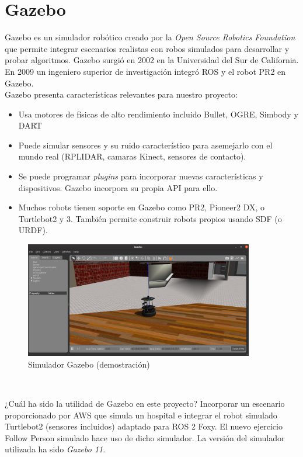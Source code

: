 \section{Gazebo}
\label{sec:gazebo}

Gazebo \cite{Gazebo} es un simulador robótico creado por la \textit{Open Source Robotics Foundation} que permite integrar escenarios realistas con robos simulados para desarrollar y probar algoritmos. Gazebo surgió en 2002 en la Universidad del Sur de California. En 2009 un ingeniero superior de investigación integró ROS y el robot PR2 en Gazebo.\\

Gazebo presenta características relevantes para nuestro proyecto:
\begin{itemize}
	\item Usa motores de físicas de alto rendimiento incluido Bullet, OGRE, Simbody y DART
	\item Puede simular sensores y su ruido característico para asemejarlo con el mundo real (RPLIDAR, camaras Kinect, sensores de contacto).
	\item Se puede programar \textit{plugins} para incorporar nuevas características y dispositivos. Gazebo incorpora su propia API para ello.
	\item Muchos robots tienen soporte en Gazebo como PR2, Pioneer2 DX,  o Turtlebot2 y 3. También permite construir robots propios usando SDF (o URDF).
\end{itemize}

\begin{figure} [H]
  \begin{center}
    \includegraphics[width=10cm]{imagenes/cap3/simulacion-gazebo.png}
  \end{center}
  \caption{Simulador Gazebo (demostración)}
  \label{fig:simulador_gazebo}
\end{figure}\

¿Cuál ha sido la utilidad de Gazebo en este proyecto? Incorporar un escenario proporcionado por AWS que simula un hospital e integrar el robot simulado Turtlebot2 (sensores incluidos) adaptado para ROS 2 Foxy. El nuevo ejercicio Follow Person simulado hace uso de dicho simulador. La versión del simulador utilizada ha sido \textit{Gazebo 11}.\\




